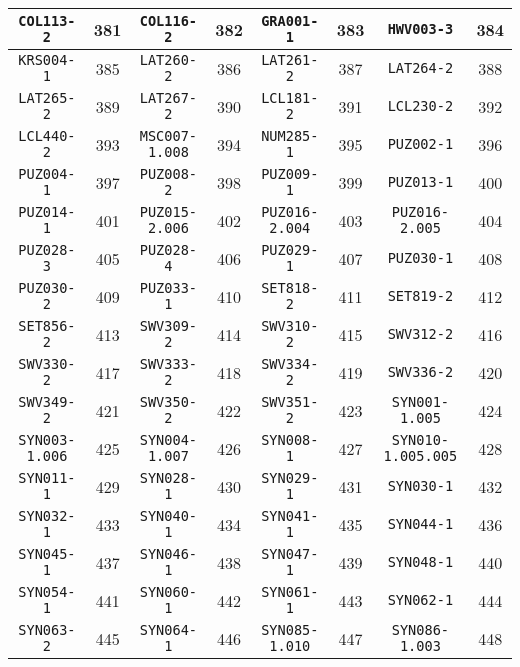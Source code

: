 \begin{table}[H]
{\begin{tabular}{|c|c|c|c|c|c|c|c|}
\hline
\texttt{COL113-2} & 381 & \texttt{COL116-2} & 382 & \texttt{GRA001-1} & 383 & \texttt{HWV003-3} & 384\\
\hline
\texttt{KRS004-1} & 385 & \texttt{LAT260-2} & 386 & \texttt{LAT261-2} & 387 & \texttt{LAT264-2} & 388\\
\hline
\texttt{LAT265-2} & 389 & \texttt{LAT267-2} & 390 & \texttt{LCL181-2} & 391 & \texttt{LCL230-2} & 392\\
\hline
\texttt{LCL440-2} & 393 & \texttt{MSC007-1.008} & 394 & \texttt{NUM285-1} & 395 & \texttt{PUZ002-1} & 396\\
\hline
\texttt{PUZ004-1} & 397 & \texttt{PUZ008-2} & 398 & \texttt{PUZ009-1} & 399 & \texttt{PUZ013-1} & 400\\
\hline
\texttt{PUZ014-1} & 401 & \texttt{PUZ015-2.006} & 402 & \texttt{PUZ016-2.004} & 403 & \texttt{PUZ016-2.005} & 404\\
\hline
\texttt{PUZ028-3} & 405 & \texttt{PUZ028-4} & 406 & \texttt{PUZ029-1} & 407 & \texttt{PUZ030-1} & 408\\
\hline
\texttt{PUZ030-2} & 409 & \texttt{PUZ033-1} & 410 & \texttt{SET818-2} & 411 & \texttt{SET819-2} & 412\\
\hline
\texttt{SET856-2} & 413 & \texttt{SWV309-2} & 414 & \texttt{SWV310-2} & 415 & \texttt{SWV312-2} & 416\\
\hline
\texttt{SWV330-2} & 417 & \texttt{SWV333-2} & 418 & \texttt{SWV334-2} & 419 & \texttt{SWV336-2} & 420\\
\hline
\texttt{SWV349-2} & 421 & \texttt{SWV350-2} & 422 & \texttt{SWV351-2} & 423 & \texttt{SYN001-1.005} & 424\\
\hline
\texttt{SYN003-1.006} & 425 & \texttt{SYN004-1.007} & 426 & \texttt{SYN008-1} & 427 & \texttt{SYN010-1.005.005} & 428\\
\hline
\texttt{SYN011-1} & 429 & \texttt{SYN028-1} & 430 & \texttt{SYN029-1} & 431 & \texttt{SYN030-1} & 432\\
\hline
\texttt{SYN032-1} & 433 & \texttt{SYN040-1} & 434 & \texttt{SYN041-1} & 435 & \texttt{SYN044-1} & 436\\
\hline
\texttt{SYN045-1} & 437 & \texttt{SYN046-1} & 438 & \texttt{SYN047-1} & 439 & \texttt{SYN048-1} & 440\\
\hline
\texttt{SYN054-1} & 441 & \texttt{SYN060-1} & 442 & \texttt{SYN061-1} & 443 & \texttt{SYN062-1} & 444\\
\hline
\texttt{SYN063-2} & 445 & \texttt{SYN064-1} & 446 & \texttt{SYN085-1.010} & 447 & \texttt{SYN086-1.003} & 448\\

\end{tabular}}
\end{table}
